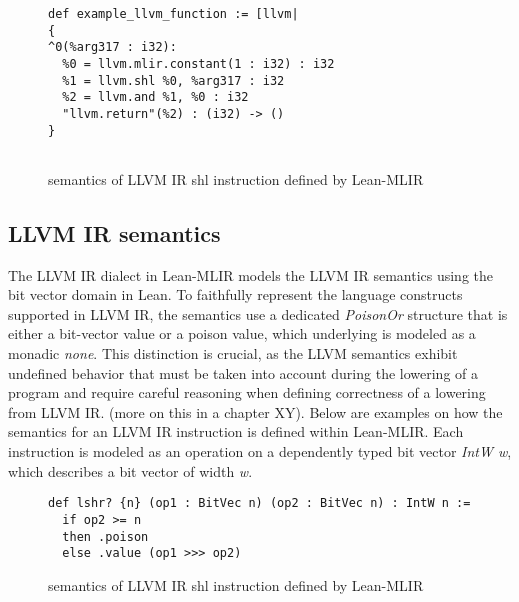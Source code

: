 \begin{figure}
\begin{minipage}{1\textwidth}
\begin{lstlisting}
def example_llvm_function := [llvm|
{
^0(%arg317 : i32):
  %0 = llvm.mlir.constant(1 : i32) : i32
  %1 = llvm.shl %0, %arg317 : i32
  %2 = llvm.and %1, %0 : i32
  "llvm.return"(%2) : (i32) -> ()
}
   
\end{lstlisting}
\end{minipage}
\caption{semantics of LLVM IR shl instruction defined by Lean-MLIR}
\label{fig:LLVMIR-SEMANTICS-SHL}
\end{figure}
\subsection{LLVM IR semantics}
The LLVM IR dialect in Lean-MLIR models the LLVM IR semantics using the bit vector domain in Lean. To faithfully represent the language constructs supported in LLVM IR, the semantics use a dedicated \textit{PoisonOr} structure that is either a bit-vector value or a poison value, which underlying is modeled as a monadic \textit{none}. This distinction is crucial, as the LLVM semantics exhibit undefined behavior that must be taken into account during the lowering of a program and require careful reasoning when defining correctness of a lowering from LLVM IR. (more on this in a chapter XY). 
Below are examples on how the semantics for an LLVM IR instruction is defined within Lean-MLIR. Each instruction is modeled as an operation on a dependently typed bit vector \textit{IntW w}, which describes a bit vector of width \textit{w}.

   
\begin{figure}
\begin{minipage}{0.45\textwidth}
\begin{lstlisting}
def lshr? {n} (op1 : BitVec n) (op2 : BitVec n) : IntW n :=
  if op2 >= n
  then .poison
  else .value (op1 >>> op2)
\end{lstlisting}
\end{minipage}
\caption{semantics of LLVM IR shl instruction defined by Lean-MLIR}
\label{fig:LLVMIR-SEMANTICS-SHL}
\end{figure}

